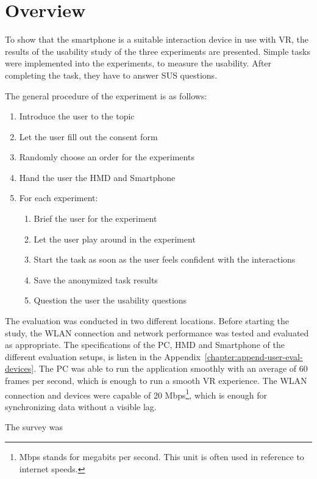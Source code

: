 \section{Overview}\label{section:evaluation-overview}

To show that the smartphone is a suitable interaction device in use with \ac{VR}, the results of the usability study of the three experiments are presented. Simple tasks were implemented into the experiments, to measure the usability. After completing the task, they have to answer \ac{SUS} questions.

The general procedure of the experiment is as follows:
\begin{enumerate}
  \item Introduce the user to the topic
  \item Let the user fill out the consent form
  \item Randomly choose an order for the experiments
  \item Hand the user the \ac{HMD} and Smartphone
  \item For each experiment:
  \begin{enumerate}
  \item Brief the user for the experiment
  \item Let the user play around in the experiment
  \item Start the task as soon as the user feels confident with the interactions
  \item Save the anonymized task results
  \item Question the user the usability questions
  \end{enumerate}
\end{enumerate}

The evaluation was conducted in two different locations. Before starting the study, the \ac{WLAN} connection and network performance was tested and evaluated as appropriate. The specifications of the \ac{PC}, \ac{HMD} and Smartphone of the different evaluation setups, is listen in the Appendix~\ref{chapter:append-user-eval-devices}. The \ac{PC} was able to run the application smoothly with an average of 60 frames per second, which is enough to run a smooth \ac{VR} experience. The \ac{WLAN} connection and devices were capable of 20 Mbps\footnote{Mbps stands for megabits per second. This unit is often used in reference to internet speeds.}, which is enough for synchronizing data without a visible lag.

The survey was \cite{Brooke.1996}